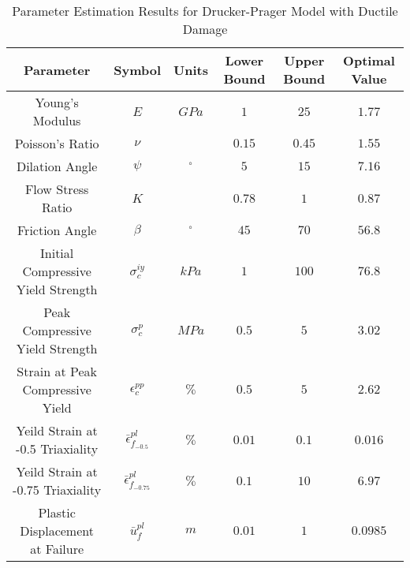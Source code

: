 \begin{table}[]
\centering
\caption{Parameter Estimation Results for Drucker-Prager Model with Ductile Damage}
\label{tab:paramDrucker}
\begin{tabular}{@{}cccccc@{}}
\toprule
Parameter                                  & Symbol                            & Units      & Lower Bound & Upper Bound & Optimal Value \\ \midrule
Young's Modulus                            & $E$                               & $GPa$      & $1$         & $25$        & $1.77$        \\
Poisson's Ratio                            & $\nu$                             &            & $0.15$      & $0.45$      & $1.55$        \\
Dilation Angle                             & $\psi$                            & $^{\circ}$ & $5$         & $15$        & $7.16$        \\
Flow Stress Ratio                          & $K$                               &            & $0.78$      & $1$         & $0.87$        \\
Friction Angle                             & $\beta$                           & $^{\circ}$ & $45$        & $70$        & $56.8$        \\
Initial Compressive Yield Strength         & $\sigma_c^{iy}$                   & $kPa$      & $1$         & $100$       & $76.8$        \\
Peak Compressive Yield Strength  & $\sigma_c^{p}$                    & $MPa$      & $0.5$       & $5$         & $3.02$        \\
Strain at Peak Compressive Yield           & $\epsilon_c^{pp}$                 & $\%$       & $0.5$       & $5$         & $2.62$        \\
Yeild Strain at -0.5 Triaxiality           & $\bar{\epsilon}^{pl}_{f_{-0.5}}$  & $\%$       & $0.01$      & $0.1$       & $0.016$       \\
Yeild Strain at -0.75 Triaxiality          & $\bar{\epsilon}^{pl}_{f_{-0.75}}$ & $\%$       & $0.1$       & $10$        & $6.97$        \\
Plastic Displacement at Failure            & $\bar{u}^{pl}_f$                  & $m$        & $0.01$      & $1$         & $0.0985$      \\ \bottomrule
\end{tabular}
\end{table}

